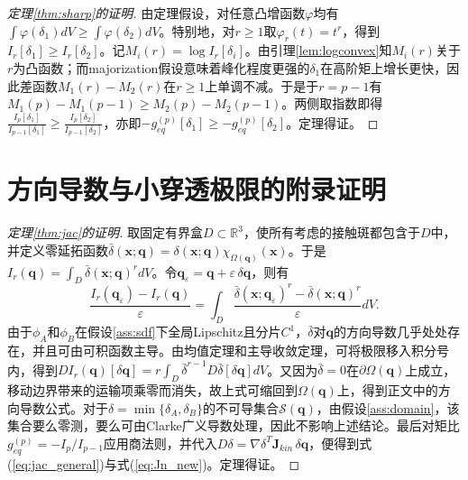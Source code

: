 ﻿\documentclass[12pt, a4paper]{ctexart}
\theoremstyle{plain}
\theoremstyle{remark}
\begin{document}
\begin{proof}[定理\ref{thm:sharp}的证明]
由定理假设，对任意凸增函数$\varphi$均有$ \int \varphi(\delta_1) dV \ge \int \varphi(\delta_2) dV $。特别地，对$r \ge 1$取$\varphi_r(t) = t^r$，得到$I_r[\delta_1] \ge I_r[\delta_2]$。记$M_i(r) = \log I_r[\delta_i]$。由引理\ref{lem:logconvex}知$M_i(r)$关于$r$为凸函数；而majorization假设意味着峰化程度更强的$\delta_1$在高阶矩上增长更快，因此差函数$M_1(r) - M_2(r)$在$r \ge 1$上单调不减。于是于$r = p-1$有$ M_1(p) - M_1(p-1) \ge M_2(p) - M_2(p-1) $。两侧取指数即得$ \frac{I_p[\delta_1]}{I_{p-1}[\delta_1]} \ge \frac{I_p[\delta_2]}{I_{p-1}[\delta_2]} $，亦即$ -g_{eq}^{(p)}[\delta_1] \ge -g_{eq}^{(p)}[\delta_2] $。定理得证。
\end{proof}

\section{方向导数与小穿透极限的附录证明}

\begin{proof}[定理\ref{thm:jac}的证明]
取固定有界盒$D \subset \mathbb{R}^3$，使所有考虑的接触斑都包含于$D$中，并定义零延拓函数$ \bar{\delta}(\bm{x};\bm{q}) = \delta(\bm{x};\bm{q}) \chi_{\Omega(\bm{q})}(\bm{x}) $。于是$I_r(\bm{q}) = \int_D \bar{\delta}(\bm{x};\bm{q})^r dV$。令$\bm{q}_{\varepsilon} = \bm{q} + \varepsilon \, \delta \bm{q}$，则有
\begin{equation}
    \frac{I_r(\bm{q}_{\varepsilon}) - I_r(\bm{q})}{\varepsilon} = \int_D \frac{\bar{\delta}(\bm{x};\bm{q}_{\varepsilon})^r - \bar{\delta}(\bm{x};\bm{q})^r}{\varepsilon} dV.
\end{equation}
由于$\phi_A$和$\phi_B$在假设\ref{ass:sdf}下全局Lipschitz且分片$C^1$，$\bar{\delta}$对$\bm{q}$的方向导数几乎处处存在，并且可由可积函数主导。由均值定理和主导收敛定理，可将极限移入积分号内，得到$ D I_r(\bm{q})[\delta \bm{q}] = r \int_D \bar{\delta}^{r-1} D\bar{\delta}[\delta \bm{q}] dV $。又因为$\bar{\delta} = 0$在$\partial \Omega(\bm{q})$上成立，移动边界带来的运输项乘零而消失，故上式可缩回到$\Omega(\bm{q})$上，得到正文中的方向导数公式。对于$\delta = \min\{\delta_A,\delta_B\}$的不可导集合$\mathcal{S}(\bm{q})$，由假设\ref{ass:domain}，该集合要么零测，要么可由Clarke广义导数处理，因此不影响上述结论。最后对矩比$g_{eq}^{(p)} = -I_p/I_{p-1}$应用商法则，并代入$ D \delta = \nabla \delta^T \bm{J}_{kin} \, \delta \bm{q} $，便得到式(\ref{eq:jac_general})与式(\ref{eq:Jn_new})。定理得证。
\end{proof}
\end{document}
